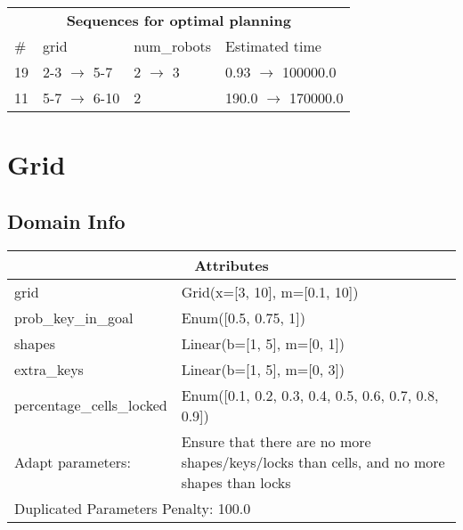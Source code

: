 \documentclass{article}
\begin{document}
                            \begin{center}
                            \begin{tabular}{l|l|l|l}
                            \multicolumn{4}{c}{\bf \large Sequences for optimal planning}\\
                            \# & grid & num\_robots & Estimated time\\\midrule
                            19&2-3 $\rightarrow$ 5-7&2 $\rightarrow$ 3&0.93 $\rightarrow$ 100000.0\\
11&5-7 $\rightarrow$ 6-10&2&190.0 $\rightarrow$ 170000.0
                            \end{tabular}
                            \end{center}
                    \newpage \section{Grid}
                    \subsection*{Domain Info}

                    \begin{center}
                    \begin{tabular}{p{}p{}}
                    \multicolumn{2}{c}{\bf \large Attributes}\\\midrule
                    grid & Grid(x=[3, 10], m=[0.1, 10])\\
prob\_key\_in\_goal & Enum([0.5, 0.75, 1])\\
shapes & Linear(b=[1, 5], m=[0, 1])\\
extra\_keys & Linear(b=[1, 5], m=[0, 3])\\
percentage\_cells\_locked & Enum([0.1, 0.2, 0.3, 0.4, 0.5, 0.6, 0.7, 0.8, 0.9])
                    
                    \\\midrule
                    Adapt parameters: & Ensure that there are no more shapes/keys/locks than cells, and no more shapes than locks
                
                     \\\midrule
                    \multicolumn{2}{l}{Duplicated Parameters Penalty: 100.0}
                    \end{tabular}
                    \end{center}
                
\end{document}
